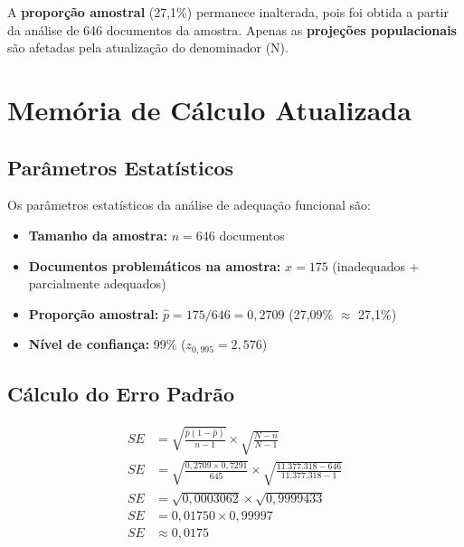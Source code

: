 \documentclass[11pt,a4paper]{article}
\begin{document}
\begin{importante}[Nota]
A \textbf{proporção amostral} (27,1\%) permanece inalterada, pois foi obtida a partir da análise de 646 documentos da amostra. Apenas as \textbf{projeções populacionais} são afetadas pela atualização do denominador (N).
\end{importante}

\section{Memória de Cálculo Atualizada}

\subsection{Parâmetros Estatísticos}

Os parâmetros estatísticos da análise de adequação funcional são:

\begin{itemize}
    \item \textbf{Tamanho da amostra:} $n = 646$ documentos
    \item \textbf{Documentos problemáticos na amostra:} $x = 175$ (inadequados + parcialmente adequados)
    \item \textbf{Proporção amostral:} $\hat{p} = 175/646 = 0{,}2709$ (27,09\% $\approx$ 27,1\%)
    \item \textbf{Nível de confiança:} 99\% ($z_{0,995} = 2{,}576$)
\end{itemize}

\subsection{Cálculo do Erro Padrão}

\begin{calculo}
\begin{align}
SE &= \sqrt{\frac{\hat{p}(1-\hat{p})}{n-1}} \times \sqrt{\frac{N-n}{N-1}} \\[0.3cm]
SE &= \sqrt{\frac{0{,}2709 \times 0{,}7291}{645}} \times \sqrt{\frac{11.377.318 - 646}{11.377.318 - 1}} \\[0.3cm]
SE &= \sqrt{0{,}0003062} \times \sqrt{0{,}9999433} \\[0.3cm]
SE &= 0{,}01750 \times 0{,}99997 \\[0.3cm]
SE &\approx 0{,}0175
\end{align}
\end{calculo}
\end{document}

